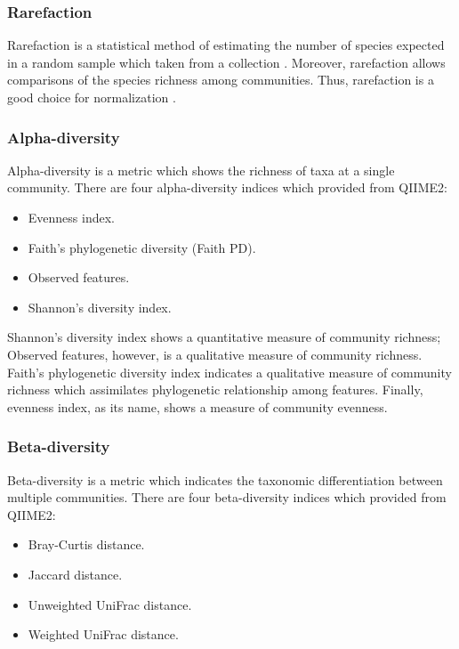 \documentclass[a4paper]{article}
\begin{document}
            \subsubsection{Rarefaction}
                Rarefaction is a statistical method of estimating the number of species expected in a random sample which taken from a collection \cite{rarefaction1}. Moreover, rarefaction allows comparisons of the species richness among communities. Thus, rarefaction is a good choice for normalization \cite{rarefaction2}.

            \subsubsection{Alpha-diversity}
                Alpha-diversity is a metric which shows the richness of taxa at a single community. There are four alpha-diversity indices which provided from QIIME2:
                \begin{itemize}
                    \item Evenness index.
                    \item Faith's phylogenetic diversity (Faith PD).
                    \item Observed features.
                    \item Shannon's diversity index.
                \end{itemize}

                Shannon's diversity index shows a quantitative measure of community richness; Observed features, however, is a qualitative measure of community richness. Faith's phylogenetic diversity index indicates a qualitative measure of community richness which assimilates phylogenetic relationship among features. Finally, evenness index, as its name, shows a measure of community evenness.

            \subsubsection{Beta-diversity}
                Beta-diversity is a metric which indicates the taxonomic differentiation between multiple communities. There are four beta-diversity indices which provided from QIIME2:
                \begin{itemize}
                    \item Bray-Curtis distance.
                    \item Jaccard distance.
                    \item Unweighted UniFrac distance.
                    \item Weighted UniFrac distance.
                \end{itemize}
\end{document}
